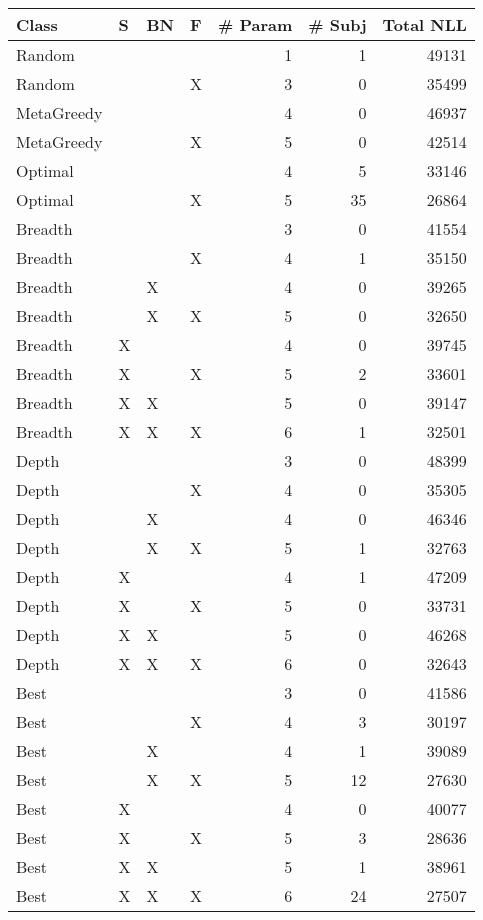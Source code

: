 \begin{tabular}{llllrrr}
\toprule
      Class &  S & BN &  F &  \# Param &  \# Subj &  Total NLL \\
\midrule
     Random &    &    &    &        1 &       1 &      49131 \\
     Random &    &    &  X &        3 &       0 &      35499 \\
 MetaGreedy &    &    &    &        4 &       0 &      46937 \\
 MetaGreedy &    &    &  X &        5 &       0 &      42514 \\
    Optimal &    &    &    &        4 &       5 &      33146 \\
    Optimal &    &    &  X &        5 &      35 &      26864 \\
    Breadth &    &    &    &        3 &       0 &      41554 \\
    Breadth &    &    &  X &        4 &       1 &      35150 \\
    Breadth &    &  X &    &        4 &       0 &      39265 \\
    Breadth &    &  X &  X &        5 &       0 &      32650 \\
    Breadth &  X &    &    &        4 &       0 &      39745 \\
    Breadth &  X &    &  X &        5 &       2 &      33601 \\
    Breadth &  X &  X &    &        5 &       0 &      39147 \\
    Breadth &  X &  X &  X &        6 &       1 &      32501 \\
      Depth &    &    &    &        3 &       0 &      48399 \\
      Depth &    &    &  X &        4 &       0 &      35305 \\
      Depth &    &  X &    &        4 &       0 &      46346 \\
      Depth &    &  X &  X &        5 &       1 &      32763 \\
      Depth &  X &    &    &        4 &       1 &      47209 \\
      Depth &  X &    &  X &        5 &       0 &      33731 \\
      Depth &  X &  X &    &        5 &       0 &      46268 \\
      Depth &  X &  X &  X &        6 &       0 &      32643 \\
       Best &    &    &    &        3 &       0 &      41586 \\
       Best &    &    &  X &        4 &       3 &      30197 \\
       Best &    &  X &    &        4 &       1 &      39089 \\
       Best &    &  X &  X &        5 &      12 &      27630 \\
       Best &  X &    &    &        4 &       0 &      40077 \\
       Best &  X &    &  X &        5 &       3 &      28636 \\
       Best &  X &  X &    &        5 &       1 &      38961 \\
       Best &  X &  X &  X &        6 &      24 &      27507 \\
\bottomrule
\end{tabular}
\unskip